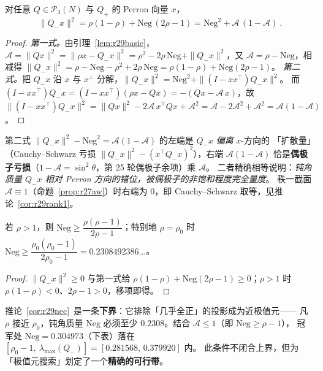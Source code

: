 \begin{theorem}\label{thm:r29align}
对任意 $Q\in\mathcal P_3(N)$ 与 $Q_+$ 的 Perron 向量 $x$，
\begin{equation}\label{eq:r29beta}
\boxed{\ \|Q_-x\|^2=\rho(1-\rho)+\mathrm{Neg}\,(2\rho-1)=\mathrm{Neg}^2+\mathcal A\,(1-\mathcal A)\ }.
\end{equation}
\end{theorem}
\begin{proof}
\emph{第一式。}由引理~\ref{lem:r29basic}，$\mathcal A=\|Qx\|^2=\|\rho x-Q_-x\|^2
=\rho^2-2\rho\,\mathrm{Neg}+\|Q_-x\|^2$，又 $\mathcal A=\rho-\mathrm{Neg}$，相减得
$\|Q_-x\|^2=\rho-\mathrm{Neg}-\rho^2+2\rho\,\mathrm{Neg}=\rho(1-\rho)+\mathrm{Neg}(2\rho-1)$。
\emph{第二式。}把 $Q_-x$ 沿 $x$ 与 $x^\perp$ 分解，$\|Q_-x\|^2=\mathrm{Neg}^2+\|(I-xx^\top)Q_-x\|^2$。
而 $(I-xx^\top)Q_-x=(I-xx^\top)(\rho x-Qx)=-(Qx-\mathcal A\,x)$，故
$\|(I-xx^\top)Q_-x\|^2=\|Qx\|^2-2\mathcal A\,x^\top Qx+\mathcal A^2
=\mathcal A-2\mathcal A^2+\mathcal A^2=\mathcal A(1-\mathcal A)$。
\end{proof}

\begin{remark}[恒等式的读法]\label{rem:r29read}
第二式 $\|Q_-x\|^2-\mathrm{Neg}^2=\mathcal A(1-\mathcal A)$ 的左端是 $Q_-x$ \emph{偏离} $x$-方向的
「扩散量」（Cauchy--Schwarz 亏损 $\|Q_-x\|^2-(x^\top Q_-x)^2$），右端 $\mathcal A(1-\mathcal A)$
恰是\textbf{偶极子亏损}（$1-\mathcal A=\sin^2\theta$，第 25 轮偶极子余项）乘 $\mathcal A$。
二者精确相等说明：\emph{钝角质量 $Q_-x$ 相对 Perron 方向的错位，被偶极子的非饱和程度完全量度}。
秩一截面 $\mathcal A\equiv1$（命题~\ref{prop:r27aw}）时右端为 $0$，即 Cauchy--Schwarz 取等，见推论~\ref{cor:r29rank1}。
\end{remark}

\begin{corollary}[近极值元的必要条件，已证]\label{cor:r29nec}
若 $\rho>1$，则 $\mathrm{Neg}\ge\dfrac{\rho(\rho-1)}{2\rho-1}$；特别地 $\rho=\rho_0$ 时
$\mathrm{Neg}\ge\dfrac{\rho_0(\rho_0-1)}{2\rho_0-1}=0.2308492386\ldots$。
\end{corollary}
\begin{proof}
$\|Q_-x\|^2\ge0$ 与第一式给 $\rho(1-\rho)+\mathrm{Neg}(2\rho-1)\ge0$；$\rho>1$ 时 $\rho(1-\rho)<0$、$2\rho-1>0$，移项即得。
\end{proof}
\begin{remark}
推论~\ref{cor:r29nec}~是一条\textbf{下界}：它排除「几乎全正」的投影成为近极值元——
凡 $\rho$ 接近 $\rho_0$，钝角质量 $\mathrm{Neg}$ 必须至少 $0.2308$。结合 $\mathcal A\le1$（即 $\mathrm{Neg}\ge\rho-1$），
冠军处 $\mathrm{Neg}=0.304973$（下表）落在 $[\rho_0-1,\ \lambda_{\max}(Q_-)]= [0.281568,\,0.379920]$ 内。
此条件不闭合上界，但为「极值元搜索」划定了一个\textbf{精确的可行带}。
\end{remark}

